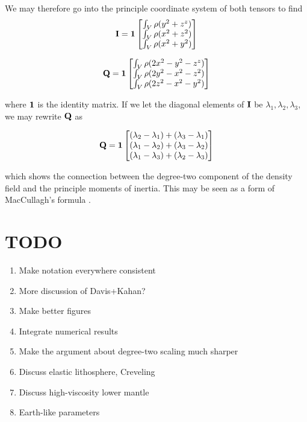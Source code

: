\documentclass[extra,mreferee]{gji}
\begin{document}
We may therefore go into the principle coordinate system of both tensors to find
\begin{equation}
{\bf I} = {\bf 1} \begin{bmatrix}
\int_V \rho (y^2+z^z)\\
\int_V \rho (x^2+z^2) \\
\int_V \rho (x^2+y^2) 
\end{bmatrix}
\end{equation}

\begin{equation}
{\bf Q} = {\bf 1} \begin{bmatrix}
\int_V \rho (2 x^2 - y^2 - z^z)\\
\int_V \rho (2 y^2 - x^2 -z^2)\\
\int_V \rho (2 z^2 - x^2 - y^2) 
\end{bmatrix}
\end{equation}

where $\bf 1$ is the identity matrix.  If we let the diagonal elements of $\bf I$ be $\lambda_1, \lambda_2, \lambda_3$, we may rewrite $\bf Q$ as

\begin{equation}
{\bf Q} = {\bf 1} \begin{bmatrix}
(\lambda_2-\lambda_1) + (\lambda_3-\lambda_1)\\
(\lambda_1-\lambda_2) + (\lambda_3-\lambda_2)\\
(\lambda_1-\lambda_3) + (\lambda_2-\lambda_3)\\
\end{bmatrix}
\label{maccullagh}
\end{equation}

which shows the connection between the degree-two component of the density field and the principle moments of inertia.  This may be seen as a form of MacCullagh's formula \citep{munk1960rotation}.


\section {TODO}

\begin{enumerate}
\item Make notation everywhere consistent
\item More discussion of Davis+Kahan?
\item Make better figures
\item Integrate numerical results
\item Make the argument about degree-two scaling much sharper
\item Discuss elastic lithosphere, Creveling
\item Discuss high-viscosity lower mantle
\item Earth-like parameters
\end{enumerate}

\label{lastpage}
\end{document}
